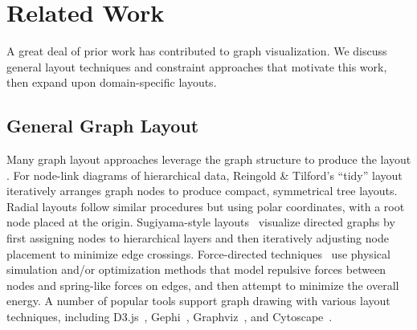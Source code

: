 \section{Related Work}

A great deal of prior work has contributed to graph visualization.
We discuss general layout techniques and constraint approaches
that motivate this work, then expand upon domain-specific layouts.

\subsection{General Graph Layout}
Many graph layout approaches leverage the graph structure to produce the 
layout \cite{herman2000graph,eades2010graph,gibson2013survey}.
For node-link diagrams of hierarchical data, Reingold \& Tilford's ``tidy'' 
layout~\cite{reingold1981tidier} iteratively arranges graph nodes to
produce compact, symmetrical tree layouts.
Radial layouts \cite{battista1998graph,herman2000graph} follow similar procedures but using polar 
coordinates, with a root node placed at the origin.
Sugiyama-style layouts~\cite{sugiyama1981methods} visualize directed graphs by first assigning nodes to hierarchical layers and then iteratively adjusting node placement to minimize edge crossings.
Force-directed techniques~\cite{tutte1963draw,kobourov2012spring,quinn1979forced,fruchterman1991graph} 
use physical simulation and/or optimization methods that model repulsive forces between nodes and spring-like forces on edges, and then attempt to minimize the overall energy. 
A number of popular tools support graph drawing with various layout 
techniques, including D3.js~\cite{bostock:d3}, Gephi~\cite{bastian2009gephi},
Graphviz~\cite{ellson2001graphviz}, and Cytoscape~\cite{shannon2003cytoscape}.

